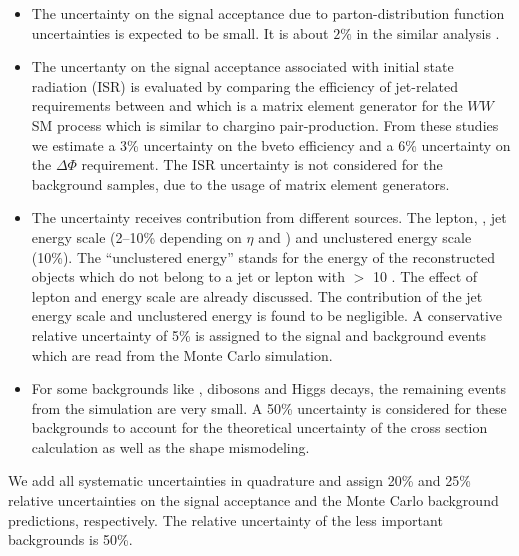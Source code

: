\begin{itemize}
\item The uncertainty on the signal acceptance due to parton-distribution
  function uncertainties is expected to be small.
  It is about $2\%$ in the similar analysis \cite{Khachatryan:2014qwa}.

\item The uncertanty on the signal acceptance associated with initial state
  radiation (ISR) is evaluated by comparing the efficiency of jet-related
  requirements between \PYTHIA and \MADGRAPH which is a matrix element generator 
  for the $WW$ SM process which
  is similar to chargino pair-production.  From these studies we estimate
  a 3\% uncertainty on the bveto efficiency and a 6\% uncertainty on the
  $\Delta \Phi$ requirement.
  The ISR uncertainty is not considered for the background samples, due to the
  usage of  matrix element  generators.


\item The \MET uncertainty receives contribution from different sources. The lepton, \Tau, jet energy scale 
(2–10\% depending on $\eta$ and \PT) and unclustered energy scale (10\%). The ``unclustered energy'' stands for the energy of the 
reconstructed objects which do not belong to a jet or lepton with \PT $>$ 10 \GEV.
The effect of lepton and \Tau energy scale are already discussed. The contribution of the jet energy scale and unclustered energy is 
found to be negligible. A conservative relative uncertainty of 5\% is assigned to the signal and background events which are read from the 
Monte Carlo simulation.
\item For some backgrounds like \ttbar,  dibosons and Higgs decays, the remaining 
events from the simulation are very small. A 50\% uncertainty is considered for these backgrounds to account for the theoretical uncertainty of the
cross section calculation as well as the shape mismodeling.
\end{itemize}


\noindent We add all systematic uncertainties in quadrature and assign 
 20\% and 25\% relative uncertainties on the signal
acceptance and the Monte Carlo background predictions, respectively. The relative uncertainty of the 
less important backgrounds is 50\%.

